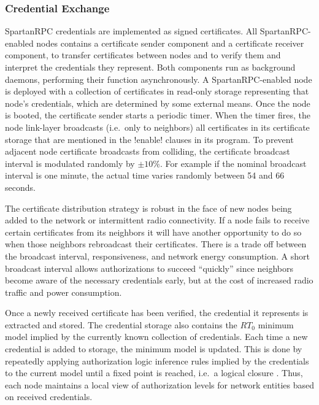 \subsubsection{Credential Exchange}
\label{section-certificate-format}

SpartanRPC credentials are implemented as signed certificates. All SpartanRPC-enabled nodes
contains a certificate sender component and a certificate receiver component, to transfer
certificates between nodes and to verify them and interpret the credentials they represent. Both
components run as background daemons, performing their function asynchronously. A
SpartanRPC-enabled node is deployed with a collection of certificates in read-only storage
representing that node's credentials, which are determined by some external means. Once the node
is booted, the certificate sender starts a periodic timer. When the timer fires, the node
link-layer broadcasts (i.e.~only to neighbors) all certificates in its certificate storage that
are mentioned in the !enable! clauses in its program. To prevent adjacent node certificate
broadcasts from colliding, the certificate broadcast interval is modulated randomly by $\pm
10$\%. For example if the nominal broadcast interval is one minute, the actual time varies
randomly between 54 and 66 seconds.

The certificate distribution strategy is robust in the face of new nodes being added to the
network or intermittent radio connectivity. If a node fails to receive certain certificates from
its neighbors it will have another opportunity to do so when those neighbors rebroadcast their
certificates. There is a trade off between the broadcast interval, responsiveness, and network
energy consumption. A short broadcast interval allows authorizations to succeed ``quickly''
since neighbors become aware of the necessary credentials early, but at the cost of increased
radio traffic and power consumption.

Once a newly received certificate has been verified, the credential it represents is extracted
and stored. The credential storage also contains the $RT_0$ minimum model implied by the
currently known collection of credentials. Each time a new credential is added to storage, the
minimum model is updated. This is done by repeatedly applying authorization logic inference
rules implied by the credentials to the current model until a fixed point is reached, i.e.~a
logical closure \cite{Li:DCFTML}. Thus, each node maintains a local view of authorization levels
for network entities based on received credentials.

